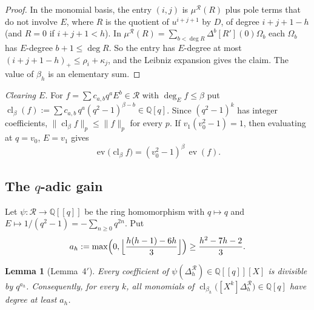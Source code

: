 \documentclass[11pt]{amsart}
\newtheorem{lemma}[theorem]{Lemma}
\theoremstyle{definition}
\theoremstyle{remark}
\numberwithin{equation}{section}
\newcommand{\QQ}{\mathbb{Q}}
\newcommand{\cR}{\mathcal{R}}
\newcommand{\Ed}{\deg_E}
\begin{document}
\begin{proof}
In the monomial basis, the entry $(i,j)$ is $\mu^{\cR}(R)$ plus pole terms that do not involve $E$, where $R$ is the
quotient of $u^{i+j+1}$ by $D$, of degree $i+j+1-h$ (and $R=0$ if $i+j+1<h$). In $\mu^{\cR}(R)=\sum_{b<\deg R}\Delta^b[R'](0)\Omega_b$
each $\Omega_b$ has $E$-degree $b+1\le\deg R$. So the entry has $E$-degree at most $(i+j+1-h)_+\le\rho_i+\kappa_j$, and
the Leibniz expansion gives the claim. The value of $\beta_h$ is an elementary sum.
\end{proof}

\emph{Clearing $E$.} For $f=\sum c_{a,b}q^aE^b\in\cR$ with $\Ed f\le\beta$ put
$\operatorname{cl}_\beta(f):=\sum c_{a,b}\,q^a(q^2-1)^{\beta-b}\in\QQ[q]$. Since $(q^2-1)^k$ has integer coefficients,
$\|\operatorname{cl}_\beta f\|_p\le\|f\|_p$ for every $p$. If $v_1(v_0^2-1)=1$, then evaluating at $q=v_0$, $E=v_1$ gives
\begin{equation}\label{eq:clear}
  \operatorname{ev}\bigl(\operatorname{cl}_\beta f\bigr)=(v_0^2-1)^\beta\,\operatorname{ev}(f).
\end{equation}

\subsection{The \texorpdfstring{$q$}{q}-adic gain}
Let $\psi\colon\cR\to\QQ[[q]]$ be the ring homomorphism with $q\mapsto q$ and $E\mapsto1/(q^2-1)=-\sum_{n\ge0}q^{2n}$. Put
\[
  a_h:=\max\Bigl(0,\Bigl\lfloor\frac{h(h-1)-6h}{3}\Bigr\rfloor\Bigr)\ge\frac{h^2-7h-2}{3} .
\]

\begin{lemma}[Lemma~4$'$]\label{lem:qadic}
Every coefficient of $\psi(\Delta^{\cR}_h)\in\QQ[[q]][X]$ is divisible by $q^{a_h}$. Consequently, for every $k$, all
monomials of $\operatorname{cl}_{\beta_h}\bigl([X^k]\Delta^{\cR}_h\bigr)\in\QQ[q]$ have degree at least $a_h$.
\end{lemma}
\end{document}
